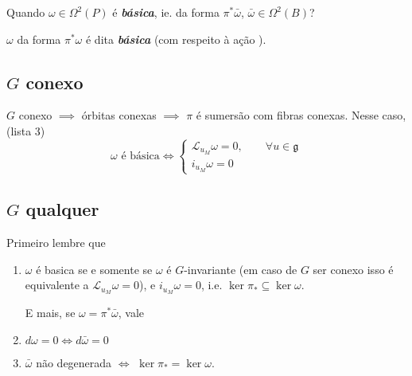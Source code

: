 \begin{question}\leavevmode
	Quando $\omega\in\Omega^{2}(P)$ é \textit{\textbf{básica}}, ie. da forma $\pi^*\bar{\omega}$, $\bar{\omega} \in\Omega^{2}(B)$?
\end{question}

\begin{defn}\leavevmode
	$\omega$ da forma $\pi^*\omega$ é dita \textit{\textbf{básica}} (com respeito à ação ).
\end{defn}

\subsection{$G$ conexo}


\begin{remark}\leavevmode
	$G$ conexo $\implies $ órbitas conexas $\implies $ $\pi$ é sumersão com fibras conexas. Nesse caso, (lista 3)
	\[\omega\text{ é básica} \iff\begin{cases}
		\mathcal{L}_{u_M}\omega=0,\qquad \forall u\in\mathfrak{g}\\
		i_{u_M}\omega=0
	\end{cases}\]
\end{remark}

\subsection{$G$ qualquer}

Primeiro lembre que

\begin{prop}\leavevmode
	\begin{enumerate}
		\item $\omega$ é basica se e somente se $\omega$ é {\color{1}$G$-invariante (em caso de $G$ ser conexo isso é equivalente a $\mathcal{L}_{u_M}\omega=0$}), e $i_{u_M}\omega=0$, i.e. $\ker \pi_* \subseteq \ker \omega$.

			E mais, se $\omega=\pi^*\bar{\omega} $, vale
		\item $ d \omega=0\iff d \bar{\omega} =0$
		\item $\bar{\omega} $ não degenerada $\iff$ $\ker \pi_* =\ker \omega$.
	\end{enumerate}
\end{prop}

